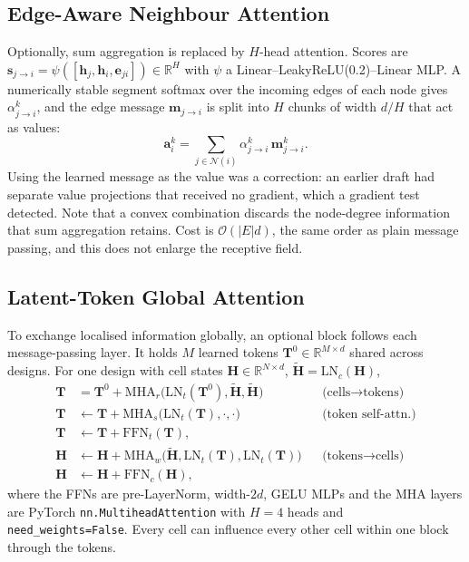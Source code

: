 \documentclass[journal]{IEEEtran}
\begin{document}
\subsection{Edge-Aware Neighbour Attention}
Optionally, sum aggregation is replaced by $H$-head attention. Scores are
$\mathbf{s}_{j\to i}=\psi([\mathbf{h}_j,\mathbf{h}_i,\mathbf{e}_{ji}])\in\mathbb{R}^H$
with $\psi$ a Linear--LeakyReLU(0.2)--Linear MLP. A numerically stable segment
softmax over the incoming edges of each node gives
$\alpha^k_{j\to i}$, and the edge message $\mathbf{m}_{j\to i}$ is split into
$H$ chunks of width $d/H$ that act as values:
\begin{equation}
\mathbf{a}^k_i=\textstyle\sum_{j\in\mathcal{N}(i)}\alpha^k_{j\to i}\,\mathbf{m}^k_{j\to i}.
\end{equation}
Using the learned message as the value was a correction: an earlier draft had
separate value projections that received no gradient, which a gradient test
detected. Note that a convex combination discards the node-degree information
that sum aggregation retains. Cost is $\mathcal{O}(|E|d)$, the same order as
plain message passing, and this does not enlarge the receptive field.

\subsection{Latent-Token Global Attention}
\label{sec:latent}
To exchange localised information globally, an optional block follows each
message-passing layer. It holds $M$ learned tokens
$\mathbf{T}^0\in\mathbb{R}^{M\times d}$ shared across designs. For one design
with cell states $\mathbf{H}\in\mathbb{R}^{N\times d}$,
$\tilde{\mathbf{H}}=\mathrm{LN}_c(\mathbf{H})$,
\begin{align}
\mathbf{T}&=\mathbf{T}^0+\mathrm{MHA}_r\big(\mathrm{LN}_t(\mathbf{T}^0),\tilde{\mathbf{H}},\tilde{\mathbf{H}}\big)
&&\text{(cells$\to$tokens)}\\
\mathbf{T}&\leftarrow\mathbf{T}+\mathrm{MHA}_s\big(\mathrm{LN}_t(\mathbf{T}),\cdot,\cdot\big)
&&\text{(token self-attn.)}\\
\mathbf{T}&\leftarrow\mathbf{T}+\mathrm{FFN}_t(\mathbf{T}),\\
\mathbf{H}&\leftarrow\mathbf{H}+\mathrm{MHA}_w\big(\tilde{\mathbf{H}},\mathrm{LN}_t(\mathbf{T}),\mathrm{LN}_t(\mathbf{T})\big)
&&\text{(tokens$\to$cells)}\\
\mathbf{H}&\leftarrow\mathbf{H}+\mathrm{FFN}_c(\mathbf{H}),
\end{align}
where the FFNs are pre-LayerNorm, width-$2d$, GELU MLPs and the MHA layers are
PyTorch \texttt{nn.MultiheadAttention} with $H=4$ heads and
\texttt{need\_weights=False}. Every cell can influence every other cell within
one block through the tokens.
\end{document}
